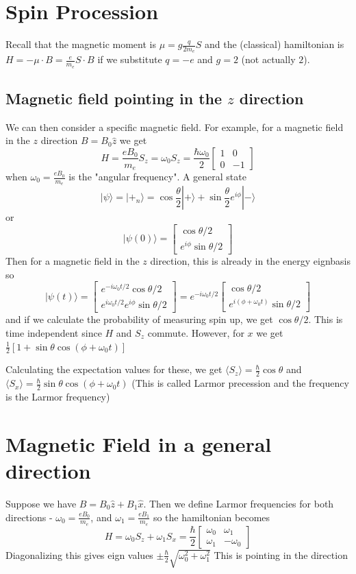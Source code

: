 \documentclass{homework}
\newcommand{\m}[1]{\begin{bmatrix} #1 \end{bmatrix}}
\newcommand{\ket}[1]{| #1 \rangle}
\begin{document}
\section{Spin Procession}
 
Recall that the magnetic moment is $\mu = g \frac{q}{2m_e}S$ and the (classical) hamiltonian is $H = - \mu \cdot B = \frac{e}{m_e}S \cdot B$ if we substitute $q = -e$ and $g= 2$ (not actually $2$).


\subsection{Magnetic field pointing in the $z$ direction}
We can then consider a specific magnetic field. For example, for a magnetic field in the $z$ direction $B = B_0\hat{z}$ we get
\[H = \frac{eB_0}{m_e}S_z = \omega_0S_z = \frac{\hbar \omega_0}{2}\m{1&0\\0& -1}\]
when $\omega_0 = \frac{eB_0}{m_e}$ is the "angular frequency". A general state 
\[\ket{\psi} = \ket{+_n} = \cos \frac{\theta}{2}\ket{+} + \sin \frac{\theta}{2}e^{i\phi}\ket{-} \]
or
\[\ket{\psi(0)} = \m{\cos \theta/2 \\ e^{i \phi}\sin \theta/2}\]
Then for a magnetic field in the $z$ direction, this is already in the energy eignbasis so 
\[\ket{\psi(t)} = \m{e^{-i\omega_0t/2}\cos \theta/2 \\ e^{i\omega_0t/2}e^{i \phi}\sin \theta/2} = e^{-i\omega_0t/2}\m{\cos \theta/2 \\ e^{i (\phi + \omega_0t)}\sin \theta/2}\]
and if we calculate the probability of measuring spin up, we get $\cos{\theta/2}$. This is time independent since $H$ and $S_z$ commute. However, for $x$ we get $\frac{1}{2}[1 + \sin \theta \cos(\phi + \omega_0t)]$

Calculating the expectation values for these, we get $\langle S_z \rangle = \frac{\hbar}{2}\cos \theta$ and $\langle S_x \rangle = \frac{\hbar}{2}\sin \theta \cos (\phi + \omega_0t)$ (This is called Larmor precession and the frequency is the Larmor frequency)

\section{Magnetic Field in a general direction}

Suppose we have $B = B_0\hat{z} + B_1\hat{x}$. Then we define Larmor frequencies for both directions - $\omega_0 = \frac{eB_0}{m_e}$, and $\omega_1 = \frac{eB_1}{m_e}$ so the hamiltonian becomes 
\[H = \omega_0S_z + \omega_1S_x = \frac{\hbar}{2}\m{\omega_0 & \omega_1 \\ \omega_1 & -\omega_0}\]
Diagonalizing this gives eign values $\pm\frac{\hbar}{2}\sqrt{\omega_0^2 + \omega_1^2}$
This is pointing in the direction
\end{document}
